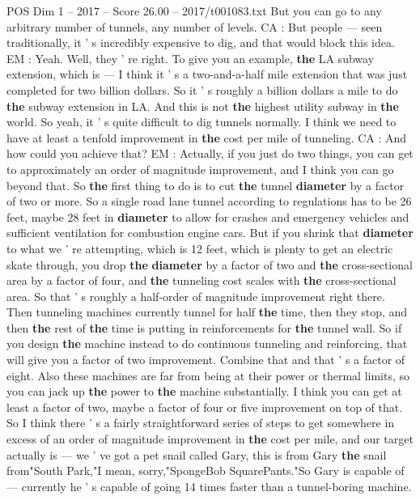 \begin{textsample}{POS Dim 1 – 2017 – Score 26.00 – 2017/t001083.txt}
But you can go to any arbitrary number of tunnels, any number of levels.
CA : But people — seen traditionally, it ' s incredibly expensive to dig, and that would block this idea.
EM : Yeah.
Well, they ' re right.
To give you an example, \textbf{the} LA subway extension, which is — I think it ' s a two-and-a-half mile extension that was just completed for two billion dollars.
So it ' s roughly a billion dollars a mile to do \textbf{the} subway extension in LA.
And this is not \textbf{the} highest utility subway in \textbf{the} world.
So yeah, it ' s quite difficult to dig tunnels normally.
I think we need to have at least a tenfold improvement in \textbf{the} cost per mile of tunneling.
CA : And how could you achieve that?
EM : Actually, if you just do two things, you can get to approximately an order of magnitude improvement, and I think you can go beyond that.
So \textbf{the} first thing to do is to cut \textbf{the} tunnel \textbf{diameter} by a factor of two or more.
So a single road lane tunnel according to regulations has to be 26 feet, maybe 28 feet in \textbf{diameter} to allow for crashes and emergency vehicles and sufficient ventilation for combustion engine cars.
But if you shrink that \textbf{diameter} to what we ' re attempting, which is 12 feet, which is plenty to get an electric skate through, you drop \textbf{the} \textbf{diameter} by a factor of two and \textbf{the} cross-sectional area by a factor of four, and \textbf{the} tunneling cost scales with \textbf{the} cross-sectional area.
So that ' s roughly a half-order of magnitude improvement right there.
Then tunneling machines currently tunnel for half \textbf{the} time, then they stop, and then \textbf{the} rest of \textbf{the} time is putting in reinforcements for \textbf{the} tunnel wall.
So if you design \textbf{the} machine instead to do continuous tunneling and reinforcing, that will give you a factor of two improvement.
Combine that and that ' s a factor of eight.
Also these machines are far from being at their power or thermal limits, so you can jack up \textbf{the} power to \textbf{the} machine substantially.
I think you can get at least a factor of two, maybe a factor of four or five improvement on top of that.
So I think there ' s a fairly straightforward series of steps to get somewhere in excess of an order of magnitude improvement in \textbf{the} cost per mile, and our target actually is — we ' ve got a pet snail called Gary, this is from Gary \textbf{the} snail from"South Park,"I mean, sorry,"SpongeBob SquarePants."So Gary is capable of — currently he ' s capable of going 14 times faster than a tunnel-boring machine.

\end{textsample}
